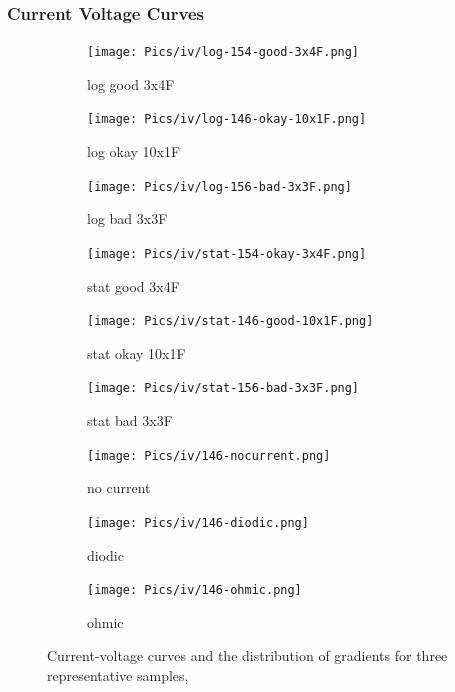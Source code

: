\subsubsection{Current Voltage Curves} 
\begin{figure}
    \centering
    \begin{subfigure}{.3\textwidth}
        \texttt{[image: Pics/iv/log-154-good-3x4F.png]}
        \caption{log good 3x4F} \label{fig:iv-log-good}
    \end{subfigure}
    \begin{subfigure}{.3\textwidth}
        \texttt{[image: Pics/iv/log-146-okay-10x1F.png]}
        \caption{log okay 10x1F} \label{fig:iv-log-okay}
    \end{subfigure}
    \begin{subfigure}{.3\textwidth}
        \texttt{[image: Pics/iv/log-156-bad-3x3F.png]}
        \caption{log bad 3x3F} \label{fig:iv-log-bad}
    \end{subfigure}
    \begin{subfigure}{.3\textwidth}
        \texttt{[image: Pics/iv/stat-154-okay-3x4F.png]}
        \caption{stat good 3x4F} \label{fig:iv-stat-good}
    \end{subfigure}
    \begin{subfigure}{.3\textwidth}
        \texttt{[image: Pics/iv/stat-146-good-10x1F.png]}
        \caption{stat okay 10x1F} \label{fig:iv-stat-okay}
    \end{subfigure}
    \begin{subfigure}{.3\textwidth}
        \texttt{[image: Pics/iv/stat-156-bad-3x3F.png]}
        \caption{stat bad 3x3F} \label{fig:iv-stat-bad}
    \end{subfigure}
    \begin{subfigure}{.3\textwidth}
        \texttt{[image: Pics/iv/146-nocurrent.png]}
        \caption{no current} \label{fig:iv-nocurrent}
    \end{subfigure}
    \begin{subfigure}{.3\textwidth}
        \texttt{[image: Pics/iv/146-diodic.png]}
        \caption{diodic} \label{fig:iv-diodic}
    \end{subfigure}
    \begin{subfigure}{.3\textwidth}
        \texttt{[image: Pics/iv/146-ohmic.png]}
        \caption{ohmic} \label{fig:iv-ohmic}
    \end{subfigure}
    \caption{Current-voltage curves and the distribution of gradients for three representative samples, }  
    \label{fig:iv}
\end{figure}

